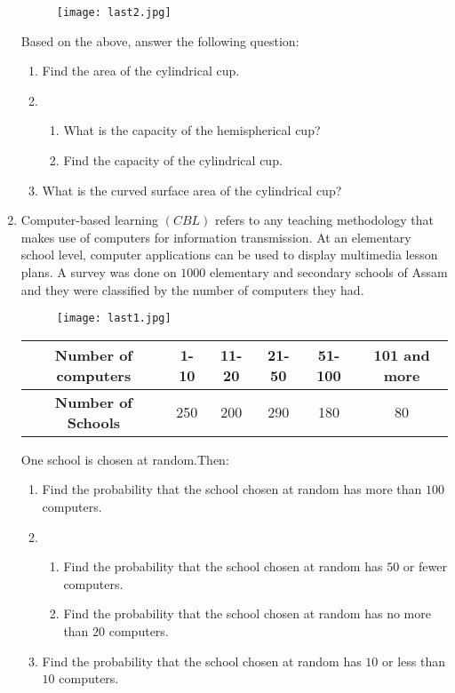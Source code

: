 \documentclass[12pt,-letter paper]{article}
\providecommand{\brak}[1]{\ensuremath{\left(#1\right)}}
\begin{document}
\begin{enumerate}
	
	\begin{figure}[!ht]
		\centering
		\texttt{[image: last2.jpg]}
		\caption{}
		\label{fig:enter-label}
	\end{figure}

	\text Based on the above, answer the following question:
	\begin{enumerate}
		\item  Find the area of the cylindrical cup.
		\item
		\begin{enumerate}
			\item  What is the capacity of the hemispherical cup?
			\item Find the capacity of the cylindrical cup.
		\end{enumerate}
		\item   What is the curved surface area of the cylindrical cup?
	\end{enumerate}
\newpage
\item Computer-based learning $\brak{CBL}$ refers to any teaching methodology that makes use of computers for information transmission. At an elementary school level, computer applications can be used to display multimedia lesson plans. A survey was done on $1000$ elementary and secondary schools of Assam and they were classified by the number of computers they had.

	\begin{figure}[!ht]
		\centering
		\texttt{[image: last1.jpg]}
		\caption{}
		\label{fig:enter-label}
	\end{figure}

	\begin{center}
	\begin{tabular}{|c|c|c|c|c|c|}
	\hline
	\textbf{Number of computers} & 1-10 & 11-20 & 21-50 &  51-100 & 101 and more \\
	\hline
	\textbf{Number of Schools} & 250 & 200 & 290 & 180 & 80 \\
	\hline
	\end{tabular}
	\end{center}

	\text One school is chosen at random.Then:
	\begin{enumerate}
		\item  Find the probability that the school chosen at random has more than $100$ computers.
		\item
		\begin{enumerate}
			\item  Find the probability that the school chosen at random has $50$ or fewer computers.
			\item  Find the probability that the school chosen at random has no more than $20$ computers.
		\end{enumerate}
		\item  Find the probability that the school chosen at random has $10$ or less than $10$ computers.
	\end{enumerate}


\end{enumerate}
\end{document}
